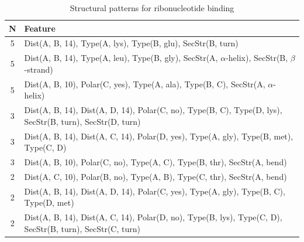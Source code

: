 \documentclass[11pt,twoside,a4paper]{book}
\begin{document}
\begin{table}\begin{tabularx}{\textwidth}{cX}\textbf{N} & \textbf{Feature} \\ \hline  
5 & Dist(A, B, 14),  Type(A, lys), Type(B, glu), SecStr(B, turn)\\ \hline 
5 & Dist(A, B, 14),  Type(A, leu), Type(B, gly), SecStr(A, $\alpha$-helix), SecStr(B, $\beta$-strand)\\ \hline 
5 & Dist(A, B, 10), Polar(C, yes),  Type(A, ala), Type(B, C), SecStr(A, $\alpha$-helix)\\ \hline 
3 & Dist(A, B, 14), Dist(A, D, 14), Polar(C, no),  Type(B, C), Type(D, lys), \newline SecStr(B, turn), SecStr(D, turn)\\ \hline 
3 & Dist(A, B, 14), Dist(A, C, 14), Polar(D, yes),  Type(A, gly), Type(B, met), \newline Type(C, D)\\ \hline 
3 & Dist(A, B, 10), Polar(C, no),  Type(A, C), Type(B, thr), SecStr(A, bend)\\ \hline 
2 & Dist(A, C, 10), Polar(B, no),  Type(A, B), Type(C, thr), SecStr(A, bend)\\ \hline 
2 & Dist(A, B, 14), Dist(A, D, 14), Polar(C, yes),  Type(A, gly), Type(B, C),  \newline Type(D, met)\\ \hline 
2 & Dist(A, B, 14), Dist(A, C, 14), Polar(D, no),  Type(B, lys), Type(C, D), \newline SecStr(B, turn), SecStr(C, turn)\\ \hline 
 \end{tabularx}\caption{Structural patterns for ribonucleotide binding}\label{tab:ribonucleotide_binding}\end{table}
\end{document}

